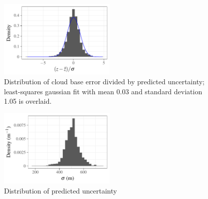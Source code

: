 \documentclass[amt,manuscript]{copernicus}\usepackage[]{graphicx}\usepackage[]{color}
\newenvironment{knitrout}{}{} %
\begin{document}
\begin{figure}
  \centering
\begin{knitrout}
\color{fgcolor}

{\centering \includegraphics[width=0.5\textwidth]{figure/method-combo-eval-pull-1} 

}



\end{knitrout}
  \caption{Distribution of cloud base error divided by predicted uncertainty;
    least-squares gaussian fit with mean 0.03 and standard deviation 1.05 is overlaid.}
  \label{fig:pull}
\end{figure}

\begin{figure}
  \centering
\begin{knitrout}
\color{fgcolor}

{\centering \includegraphics[width=0.5\textwidth]{figure/method-combo-eval-rmse-1} 

}



\end{knitrout}
  \caption{Distribution of predicted uncertainty}
  \label{fig:uncertainty}
\end{figure}

\end{document}
